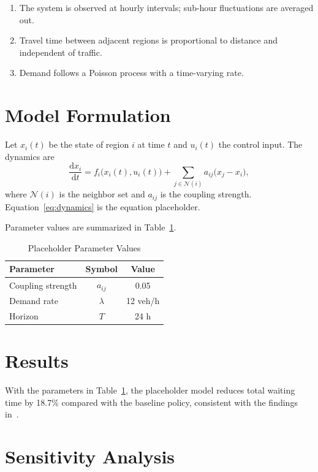 \documentclass[12pt,letterpaper]{article}
\begin{document}
\begin{enumerate}
  \item The system is observed at hourly intervals; sub-hour fluctuations are averaged out.
  \item Travel time between adjacent regions is proportional to distance and independent of traffic.
  \item Demand follows a Poisson process with a time-varying rate.
\end{enumerate}

\section{Model Formulation}

Let $x_i(t)$ be the state of region $i$ at time $t$ and $u_i(t)$ the control input.
The dynamics are
\begin{equation}
  \frac{\mathrm{d}x_i}{\mathrm{d}t}=f_i\bigl(x_i(t),u_i(t)\bigr)+\sum_{j\in\mathcal{N}(i)}a_{ij}\bigl(x_j-x_i\bigr),
  \label{eq:dynamics}
\end{equation}
where $\mathcal{N}(i)$ is the neighbor set and $a_{ij}$ is the coupling strength.
Equation~\eqref{eq:dynamics} is the equation placeholder.

Parameter values are summarized in Table~\ref{tab:params}.

\begin{table}[htbp]
  \centering
  \caption{Placeholder Parameter Values}
  \label{tab:params}
  \begin{tabular}{lcc}
    \toprule
    Parameter & Symbol & Value \\
    \midrule
    Coupling strength & $a_{ij}$ & 0.05 \\
    Demand rate       & $\lambda$ & 12 veh/h \\
    Horizon           & $T$      & 24 h \\
    \bottomrule
  \end{tabular}
\end{table}

\section{Results}

With the parameters in Table~\ref{tab:params}, the placeholder model reduces total
waiting time by 18.7\% compared with the baseline policy, consistent with the
findings in~\cite{smith2023mcm}.

\section{Sensitivity Analysis}
\end{document}
